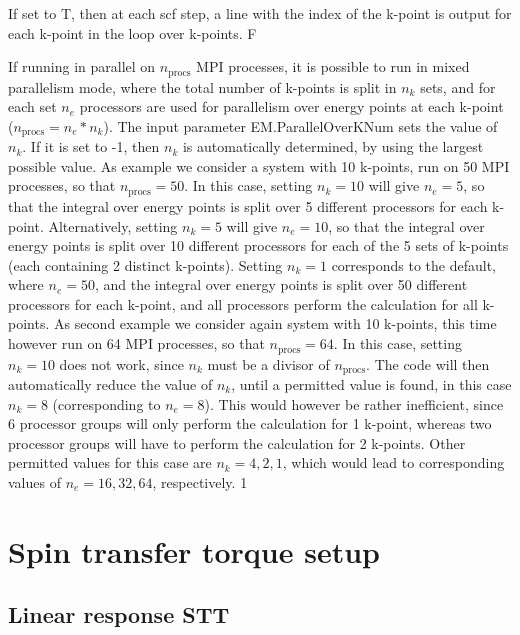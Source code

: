 \documentclass[11pt]{article}
\begin{document}
{
{If set to T, then at each scf step, a line with the index of the k-point is output for each k-point in the loop over k-points.}
{F}

{If running in parallel on $n_\mathrm{procs}$ MPI processes, it is possible to run in mixed parallelism mode, where the total number of k-points is split in $n_k$ sets, and for each set $n_e$ processors are used for parallelism over energy points at each k-point ($n_\mathrm{procs}=n_e*n_k$). The input parameter EM.ParallelOverKNum sets the value of $n_k$. If it is set to -1, then $n_k$ is automatically determined, by using the largest possible value. As example we consider a system with 10 k-points, run on 50 MPI processes, so that $n_\mathrm{procs}=50$. In this case, setting $n_k=10$ will give $n_e=5$, so that the integral over energy points is split over 5 different processors for each k-point. Alternatively, setting  $n_k=5$ will give $n_e=10$, so that the integral over energy points is split over 10 different processors for each of the 5 sets of k-points (each containing 2 distinct k-points). Setting $n_k=1$ corresponds to the default, where $n_e=50$, and the integral over energy points is split over 50 different processors for each k-point, and all processors perform the calculation for all k-points. As second example we consider again system with 10 k-points, this time however run on 64 MPI processes, so that $n_\mathrm{procs}=64$. In this case, setting $n_k=10$ does not work, since $n_k$ must be a divisor of $n_\mathrm{procs}$. The code will then automatically reduce the value of $n_k$, until a permitted value is found, in this case $n_k=8$ (corresponding to $n_e=8$). This would however be rather inefficient, since 6 processor groups will only perform the calculation for 1 k-point, whereas two processor groups will have to perform the calculation for 2 k-points. Other permitted values for this case are $n_k=4,2,1$, which would lead to corresponding values of $n_e=16,32,64$, respectively.
}
{1}


\newpage
\section {Spin transfer torque setup}

\subsection{Linear response STT}

}
\end{document}
